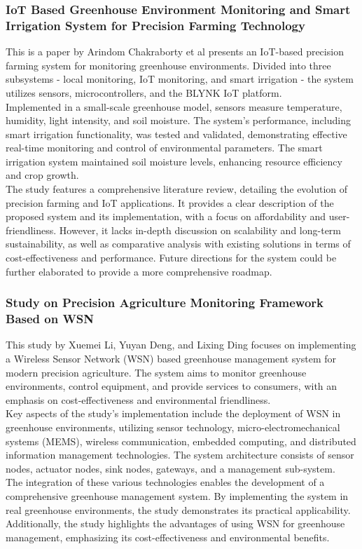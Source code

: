 \documentclass[12pt, a4paper]{article}
\begin{document}
\subsubsection{IoT Based Greenhouse Environment Monitoring and Smart Irrigation System for Precision Farming Technology}
This is a paper by Arindom Chakraborty et al\cite{chakraborty2022iot} presents an IoT-based precision farming system for monitoring greenhouse environments. Divided into three subsystems - local monitoring, IoT monitoring, and smart irrigation - the system utilizes sensors, microcontrollers, and the BLYNK IoT platform.\\
Implemented in a small-scale greenhouse model, sensors measure temperature, humidity, light intensity, and soil moisture. The system's performance, including smart irrigation functionality, was tested and validated, demonstrating effective real-time monitoring and control of environmental parameters. The smart irrigation system maintained soil moisture levels, enhancing resource efficiency and crop growth.\\
The study features a comprehensive literature review, detailing the evolution of precision farming and IoT applications. It provides a clear description of the proposed system and its implementation, with a focus on affordability and user-friendliness. However, it lacks in-depth discussion on scalability and long-term sustainability, as well as comparative analysis with existing solutions in terms of cost-effectiveness and performance. Future directions for the system could be further elaborated to provide a more comprehensive roadmap.

\subsubsection{Study on Precision Agriculture Monitoring Framework Based on WSN}
This study by Xuemei Li, Yuyan Deng, and Lixing Ding\cite{li2008study} focuses on implementing a Wireless Sensor Network (WSN) based greenhouse management system for modern precision agriculture. The system aims to monitor greenhouse environments, control equipment, and provide services to consumers, with an emphasis on cost-effectiveness and environmental friendliness.\\
Key aspects of the study's implementation include the deployment of WSN in greenhouse environments, utilizing sensor technology, micro-electromechanical systems (MEMS), wireless communication, embedded computing, and distributed information management technologies. The system architecture consists of sensor nodes, actuator nodes, sink nodes, gateways, and a management sub-system.\\
The integration of these various technologies enables the development of a comprehensive greenhouse management system. By implementing the system in real greenhouse environments, the study demonstrates its practical applicability. Additionally, the study highlights the advantages of using WSN for greenhouse management, emphasizing its cost-effectiveness and environmental benefits.
\end{document}
